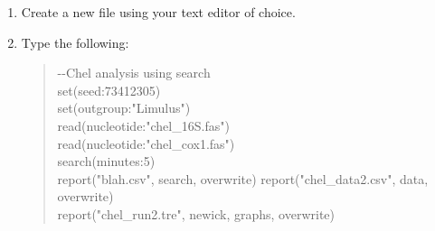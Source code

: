 \documentclass[11pt]{article}
\begin{document}
\begin{enumerate}
\item Create a new file using your text editor of choice.

\item Type the following:
	
	\begin{quote}
	-\/-Chel analysis using search\\
	set(seed:73412305)\\
	set(outgroup:"Limulus")\\
	read(nucleotide:"chel\_16S.fas")\\
	read(nucleotide:"chel\_cox1.fas")\\
	search(minutes:5)\\
	report("blah.csv", search, overwrite)
	report("chel\_data2.csv", data, overwrite)\\
	report("chel\_run2.tre", newick, graphs, overwrite)\\
	\end{quote}
%
%
%
%

\end{enumerate}
\end{document}
